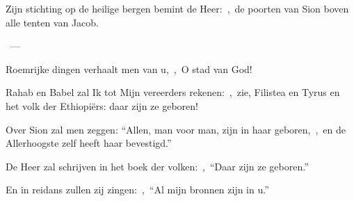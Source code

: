 \documentclass[12pt,twoside,a5paper]{article}
\begin{document}

\begin{halfparskip}
   Zijn stichting op de heilige bergen bemint de Heer:~\sep\ de poorten van Sion boven alle tenten van Jacob.

  ~--- 

  Roemrijke dingen verhaalt men van u,~\sep\ O stad van God!

  Rahab en Babel zal Ik tot Mijn vereerders rekenen:~\sep\ zie, Filistea en Tyrus en het volk der Ethiopiërs: daar zijn ze geboren!

  Over Sion zal men zeggen: ``Allen, man voor man, zijn in haar geboren,~\sep\ en de Allerhoogste zelf heeft haar bevestigd.''

  De Heer zal schrijven in het boek der volken:~\sep\ ``Daar zijn ze geboren.''

  En in reidans zullen zij zingen:~\sep\ ``Al mijn bronnen zijn in u.''
\end{halfparskip}
\end{document}
